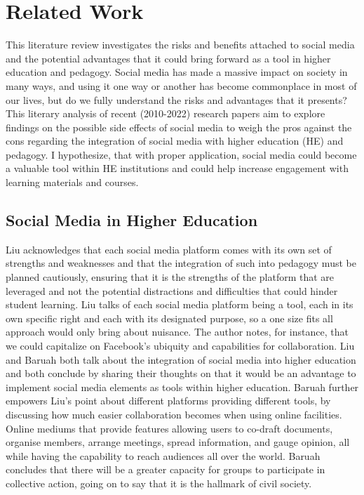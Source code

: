 \documentclass[lettersize,journal]{IEEEtran}
\begin{document}
\section{Related Work}
    This literature review investigates the risks and benefits attached to
    social media and the potential advantages that it could bring forward as a
    tool in higher education and pedagogy. Social media has made a massive
    impact on society in many ways, and using it one way or another has become
    commonplace in most of our lives, but do we fully understand the risks and
    advantages that it presents? This literary analysis of recent (2010-2022)
    research papers aim to explore findings on the possible side effects of
    social media to weigh the pros against the cons regarding
    the integration of social media with higher education (HE) and pedagogy. I
    hypothesize, that with proper application, social media could become a valuable
    tool within HE institutions and could help increase engagement with learning
    materials and courses.

\subsection{Social Media in Higher Education}
    Liu \cite{Liu2010} acknowledges that each social media platform comes with
    its own set of strengths and weaknesses and that the integration of such into
    pedagogy must be planned cautiously, ensuring that it is the strengths of the platform
    that are leveraged and not the potential distractions and difficulties that could
    hinder student learning. Liu talks of each social media platform being a tool,
    each in its own specific right and each with its designated purpose, so a one size
    fits all approach would only bring about nuisance. The author notes, for instance,
    that we could capitalize on Facebook's ubiquity and capabilities for collaboration.
    Liu \cite{Liu2010} and Baruah \cite{Baruah2012} both talk about the integration of
    social media into higher education and both conclude by sharing their thoughts on that
    it would be an advantage to implement social media elements as tools within higher
    education. Baruah further empowers Liu's point about different platforms providing
    different tools, by discussing how much easier collaboration becomes when using
    online facilities. Online mediums that provide features allowing users to co-draft
    documents, organise members, arrange meetings, spread information, and gauge opinion,
    all while having the capability to reach audiences all over the world.
    Baruah concludes that there will be a greater capacity for groups to participate in
    collective action, going on to say that it is the hallmark of civil society.
\end{document}
